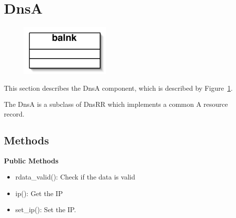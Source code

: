 \section{DnsA}\label{sec:dnsa}

\begin{figure}
\begin{center}
\includegraphics[width=0.4\textwidth]{figs/blank}
\end{center}
\caption{}
\label{fig:dnsa}
\end{figure}

This section describes the DnsA component, which is described by Figure~\ref{fig:dnsa}.  

The DnsA is a subclass of DnsRR which implements a common A resource record.

\subsection{Methods}

{\bf Public Methods}
\begin{itemize}
\item rdata\_valid(): Check if the data is valid
\item ip(): Get the IP
\item set\_ip(): Set the IP.
\end{itemize}


